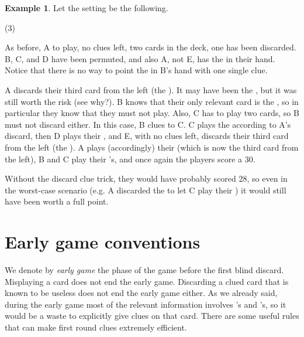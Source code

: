 \documentclass[a4paper]{article}
\theoremstyle{plain}
\theoremstyle{definition}
\newtheorem{example}[theorem]{Example}
\begin{document}
\begin{example}
	
	Let the setting be the following.
	
	\begin{tasks}(3)
		\task[+]      
		\task[A]    
		\task[B]    
		\task[C]    
		\task[D]    
		\task[E]    
	\end{tasks}
	
	As before, A to play, no clues left, two cards in the deck, one  has been discarded. B, C, and D have been permuted, and also A, not E, has the  in their hand. Notice that there is no way to point the  in B's hand with one single clue.
	
	A discards their third card from the left (the ). It may have been the , but it was still worth the risk (see why?). B knows that their only relevant card is the , so in particular they know that they must not play. Also, C has to play two cards, so B must not discard either. In this case, B clues  to C. C plays the  according to A's discard, then D plays their , and E, with no clues left, discards their third card from the left (the ). A plays (accordingly) their  (which is now the third card from the left), B and C play their 's, and once again the players score a 30.
\end{example}

Without the discard clue trick, they would have probably scored 28, so even in the worst-case scenario (e.g. A discarded the  to let C play their ) it would still have been worth a full point.

\section{Early game conventions}
\label{sec:earlygame}

We denote by \textit{early game} the phase of the game before the first blind discard. Misplaying a card does not end the early game. Discarding a clued card that is known to be useless does not end the early game either. As we already said, during the early game most of the relevant information involves 's and 's, so it would be a waste to explicitly give clues on that card. There are some useful rules that can make first round clues extremely efficient.
\end{document}
